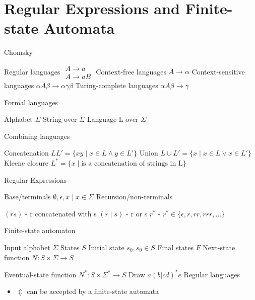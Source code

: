 \section{Regular Expressions and Finite-state Automata}
\begin{itemize}
\bulletitem Chomsky
\begin{itemize}
\bulletitem Regular languages \( \begin{matrix} A \rightarrow a \\ A \rightarrow aB \end{matrix} \)
\bulletitem Context-free languages \( A \rightarrow \alpha \)
\bulletitem Context-sensitive languages \( \alpha A \beta \rightarrow \alpha \gamma \beta \)
\bulletitem Turing-complete languages \( \alpha A \beta \rightarrow \gamma \)
\end{itemize}
\bulletitem Formal languages
\begin{itemize}
\bulletitem Alphabet \( \Sigma \)
\bulletitem String over \( \Sigma \)
\bulletitem Language L over \( \Sigma \)
\end{itemize}
\bulletitem Combining languages
\begin{itemize}
\bulletitem Concatenation \( LL' = \{ xy \mid x \in L \wedge y \in L' \} \)
\bulletitem Union \( L \cup L' = \{ x \mid x \in L \vee x \in L' \} \)
\bulletitem Kleene closure \( L^* = \{ x \mid \text{is a concatenation of strings in L} \} \)
\end{itemize}
\bulletitem Regular Expressions
\begin{itemize}
\bulletitem Base/terminals \( \emptyset ,\epsilon ,x \mid x \in \Sigma \)
\bulletitem Recursion/non-terminals
\begin{itemize}
\bulletitem \( (rs) \) - r concatenated with s
\bulletitem \( (r \mid s) \) - r or s
\bulletitem \( r^* \) - \( r^* \in \{ \epsilon ,r,rr,rrr, \ldots \} \)
\end{itemize}
\end{itemize}
\bulletitem Finite-state automaton
\begin{itemize}
\bulletitem Input alphabet \( \Sigma \)
\bulletitem States \( S \)
\bulletitem Initial state \( s_0 ,s_0 \in S \)
\bulletitem Final states \( F \)
\bulletitem Next-state function \( N : S \times \Sigma \rightarrow S \)
\end{itemize}
\bulletitem Eventual-state function \( N^* : S \times \Sigma^* \rightarrow S \)
\bulletitem Draw \( a(b|cd)^*e \)
\bulletitem Regular languages
\begin{itemize}
\bulletitem can be defined by a regular expression
\item[]\( \Updownarrow \)
\bulletitem can be accepted by a finite-state automata
\end{itemize}
\end{itemize}